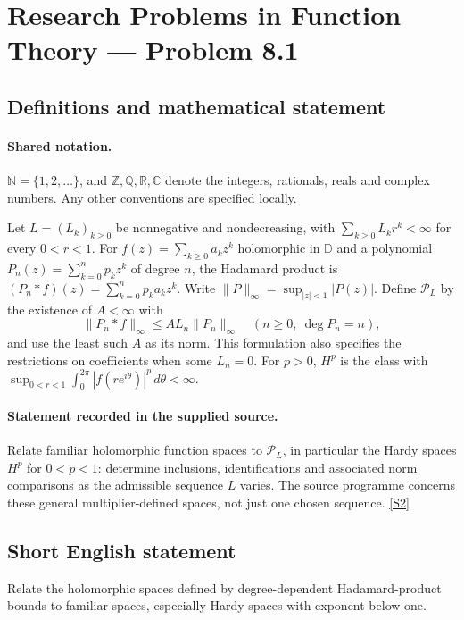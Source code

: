 \documentclass[11pt]{article}
\newcommand{\sref}[2]{\hyperlink{source:#1:#2}{[S#2]}}
\begin{document}
\section{Research Problems in Function Theory — Problem 8.1}\label{statement}

\subsection{Definitions and mathematical statement}

\paragraph{Shared notation.}$\mathbb N=\{1,2,\ldots\}$, and $\mathbb Z,\mathbb Q,\mathbb R,\mathbb C$ denote the integers, rationals, reals and complex numbers. Any other conventions are specified locally.


Let $L=(L_k)_{k\ge0}$ be nonnegative and nondecreasing, with $\sum_{k\ge0}L_kr^k<\infty$ for every $0<r<1$. For $f(z)=\sum_{k\ge0}a_kz^k$ holomorphic in $\mathbb D$ and a polynomial $P_n(z)=\sum_{k=0}^np_kz^k$ of degree $n$, the Hadamard product is $(P_n*f)(z)=\sum_{k=0}^np_ka_kz^k$. Write $\|P\|_\infty=\sup_{|z|<1}|P(z)|$. Define $\mathcal P_L$ by the existence of $A<\infty$ with
\[\|P_n*f\|_\infty\le A L_n\|P_n\|_\infty\quad(n\ge0,\ \deg P_n=n),
\]
and use the least such $A$ as its norm. This formulation also specifies the restrictions on coefficients when some $L_n=0$. For $p>0$, $H^p$ is the class with $\sup_{0<r<1}\int_0^{2\pi}|f(re^{i\theta})|^p\,d\theta<\infty$.
\paragraph{Statement recorded in the supplied source.}
Relate familiar holomorphic function spaces to $\mathcal P_L$, in particular the Hardy spaces $H^p$ for $0<p<1$: determine inclusions, identifications and associated norm comparisons as the admissible sequence $L$ varies. The source programme concerns these general multiplier-defined spaces, not just one chosen sequence. \sref{statement}{2}
\subsection{Short English statement}
Relate the holomorphic spaces defined by degree-dependent Hadamard-product bounds to familiar spaces, especially Hardy spaces with exponent below one.
\end{document}
